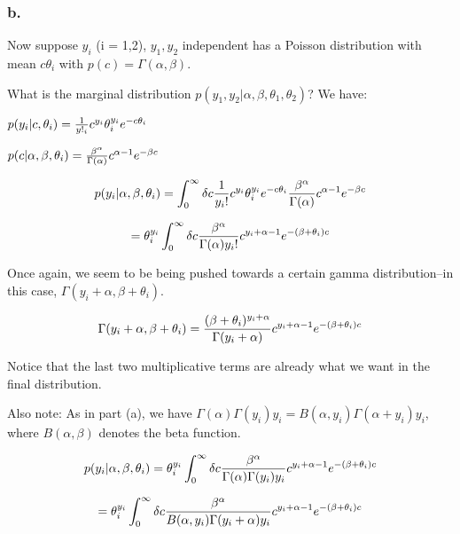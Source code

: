 \documentclass{article}
\begin{document}
\subsubsection{b.}

Now suppose \(y_i\) (i = 1,2), \(y_1, y_2\) independent
has a Poisson distribution with mean \(c \theta_i\) with \(p(c) = \Gamma(\alpha, \beta)\).

What is the marginal distribution \(p(y_1, y_2 \vert \alpha, \beta, \theta_1, \theta_2)\)? We have:

\(p(y_i \vert c, \theta_i) = {1 \over y!_{i}} c^{y_i} \theta_i^{y_i} e^{-c\theta_i}\)

\(p(c \vert \alpha, \beta, \theta_i) = { \beta^{\alpha} \over \Gamma(\alpha)} c^{\alpha - 1}e^{-\beta c}\)


\begin{equation}
p(y_i \vert \alpha, \beta, \theta_i) = 
\int_{0}^{\infty} \delta c {1 \over {y_{i}}!} c^{y_i} \theta_i^{y_i} e^{-c\theta_i} 
{ \beta^{\alpha} \over \Gamma(\alpha)} c^{\alpha - 1}e^{-\beta c}
\end{equation}

\[ = \theta_i^{y_i} \int_{0}^{\infty} \delta c 
{ \beta^{\alpha} \over \Gamma(\alpha) {y_{i}}!} c^{y_i + \alpha - 1}e^{-(\beta + \theta_i)c}\]

Once again, we seem to be being pushed towards a certain gamma distribution--in this case, 
\(\Gamma(y_i + \alpha, \beta + \theta_i)\).

\begin{equation}
\Gamma(y_i + \alpha, \beta + \theta_i) = {(\beta + \theta_i)^{y_i + \alpha} \over \Gamma(y_i + \alpha) } c^{y_i + \alpha - 1}e^{-(\beta + \theta_i)c}
\end{equation}

Notice that the last two multiplicative terms are already what we want in the final distribution.

Also note: As in part (a), we have 
\( \Gamma(\alpha)\Gamma(y_{i})y_{i} = B(\alpha, y_{i})\Gamma(\alpha + y_{i})y_{i}\), 
where \(B(\alpha, \beta)\) denotes the beta function.


\[ p(y_i \vert \alpha, \beta, \theta_i) = \theta_i^{y_i} \int_{0}^{\infty} \delta c 
{ \beta^{\alpha} \over \Gamma(\alpha) \Gamma(y_{i})y_{i}} c^{y_i + \alpha - 1}e^{-(\beta + \theta_i)c}\]

\[ =  \theta_i^{y_i} \int_{0}^{\infty} \delta c 
{ \beta^{\alpha} \over B(\alpha, y_{i})\Gamma(y_{i} + \alpha)y_{i}} c^{y_i + \alpha - 1}e^{-(\beta + \theta_i)c}\]
\end{document}
